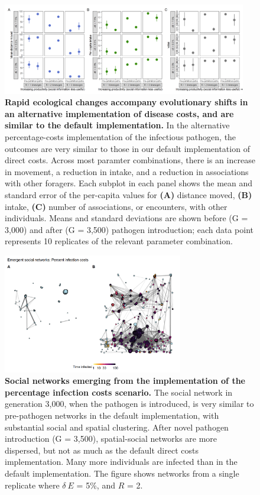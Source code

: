 \begin{figure}
    \centering
    \includegraphics[width=0.95\textwidth]{figures/pathomove/fig_eco_compare_percent.png}
    \caption{
        \textbf{Rapid ecological changes accompany evolutionary shifts in an alternative implementation of disease costs, and are similar to the default implementation.} 
        In the alternative percentage-costs implementation of the infectious pathogen, the outcomes are very similar to those in our default implementation of direct costs. 
        Across most paramter combinations, there is an increase in movement, a reduction in intake, and a reduction in associations with other foragers.
        Each subplot in each panel shows the mean and standard error of the per-capita values for \textbf{(A)} distance moved, \textbf{(B)} intake, \textbf{(C)} number of associations, or encounters, with other individuals.
        Means and standard deviations are shown before (G = 3,000) and after (G = 3,500) pathogen introduction; each data point represents 10 replicates of the relevant parameter combination.
    }
\end{figure}

\begin{figure}
    \centering
    \includegraphics[width=0.7\textwidth]{figures/pathomove/fig_networks_percent.png}
    \caption{
        \textbf{Social networks emerging from the implementation of the percentage infection costs scenario.} 
        The social network in generation 3,000, when the pathogen is introduced, is very similar to pre-pathogen networks in the default implementation, with substantial social and spatial clustering.
        After novel pathogen introduction (G = 3,500), spatial-social networks are more dispersed, but not as much as the default direct costs implementation.
        Many more individuals are infected than in the default implementation.
        The figure shows networks from a single replicate where $\delta~E$ = 5\%, and $R$ = 2.
    }
\end{figure}

{ \begin{center}  \end{center} }

\endgroup

